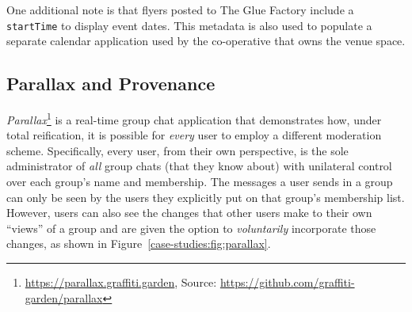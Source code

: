 
One additional note is that flyers posted to The Glue Factory include a \texttt{startTime}
to display event dates.
This metadata is also used to populate a separate calendar application
used by the co-operative that owns the venue space.




\subsection{Parallax and Provenance}
\label{case-studies:parallax}


\emph{Parallax}\footnote{
\url{https://parallax.graffiti.garden}, Source: \url{https://github.com/graffiti-garden/parallax}
} is a real-time group chat application that demonstrates
how, under total reification, it is possible for \emph{every} user to employ a different
moderation scheme.
Specifically,
every user, from their own perspective,
is the sole administrator of \emph{all} group chats (that they know about) with
unilateral control over each group's name and membership.
The messages a user sends in a group can only be seen by the users they explicitly
put on that group's membership list.
However, users can also see the changes that other users
make to their own ``views'' of a group and are given the option
to \emph{voluntarily} incorporate those changes,
as shown in Figure~\ref{case-studies:fig:parallax}.

